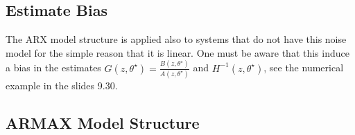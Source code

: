 \subsection{Estimate Bias}
\label{sec:estimate-bias-ARMAX}

The ARX model structure is applied also to systems that do not have this noise model for the simple reason that it is linear. One must be aware that this induce a bias in the estimates $G(z,\theta^\star) = \tfrac{B(z,\theta^\star)}{A(z,\theta^\star)}$ and $H^{-1}(z,\theta^\star)$, see the numerical example in the slides 9.30.


\subsection{ARMAX Model Structure}
\label{sec:ARMAX}

